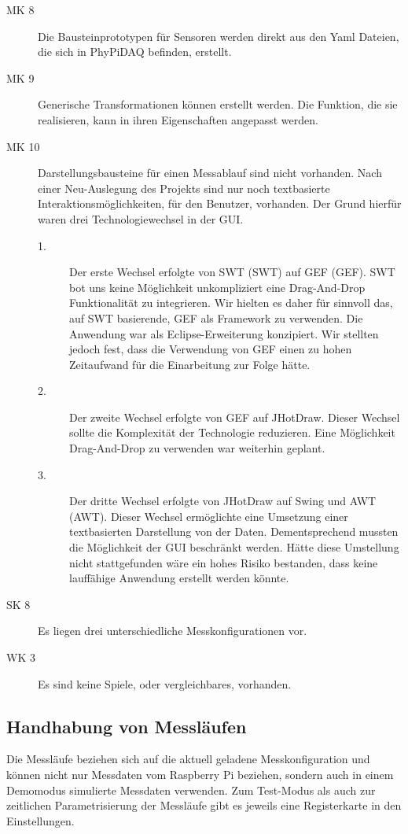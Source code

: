 \documentclass[parskip=full]{scrartcl}
\begin{document}
\begin{description}
\item[MK 8] Die Bausteinprototypen für Sensoren werden direkt aus den Yaml Dateien, die sich in PhyPiDAQ befinden, erstellt.
\item[MK 9] Generische Transformationen können erstellt werden. Die Funktion, die sie realisieren, kann in ihren Eigenschaften angepasst werden.
\item[MK 10] Darstellungsbausteine für einen Messablauf sind nicht vorhanden. Nach einer Neu-Auslegung des Projekts sind nur noch textbasierte Interaktionsmöglichkeiten, für den Benutzer, vorhanden. Der Grund hierfür waren drei Technologiewechsel in der GUI.
\begin{description}

	\item[1.] Der erste Wechsel erfolgte von \gls{SWT} (SWT) auf \gls{GEF} (GEF). SWT bot uns keine Möglichkeit unkompliziert eine Drag-And-Drop Funktionalität zu integrieren. Wir hielten es daher für sinnvoll das, auf SWT basierende, GEF als Framework zu verwenden. Die Anwendung war als Eclipse-Erweiterung konzipiert. Wir stellten jedoch fest, dass die Verwendung von GEF einen zu hohen Zeitaufwand für die Einarbeitung zur Folge hätte.
	\item[2.] Der zweite Wechsel erfolgte von GEF auf \gls{JHotDraw}. Dieser Wechsel sollte die Komplexität der Technologie reduzieren. Eine Möglichkeit Drag-And-Drop zu verwenden war weiterhin geplant.
	\item[3.] Der dritte Wechsel erfolgte von JHotDraw auf \gls{Swing} und \gls{AWT} (AWT). Dieser Wechsel ermöglichte eine Umsetzung einer textbasierten Darstellung von der Daten. Dementsprechend mussten die Möglichkeit der GUI beschränkt werden. Hätte diese Umstellung nicht stattgefunden wäre ein hohes Risiko bestanden, dass keine lauffähige Anwendung erstellt werden könnte.

\end{description}
\item[SK 8] Es liegen drei unterschiedliche Messkonfigurationen vor.
\item[WK 3] Es sind keine Spiele, oder vergleichbares, vorhanden.
\end{description}

\subsection{Handhabung von Messläufen}

Die Messläufe beziehen sich auf die aktuell geladene Messkonfiguration und können nicht  nur Messdaten vom Raspberry Pi beziehen, sondern auch in einem Demomodus simulierte Messdaten verwenden. Zum Test-Modus als auch zur zeitlichen Parametrisierung der Messläufe gibt es jeweils eine Registerkarte in den Einstellungen.  
\end{document}
